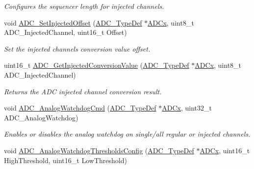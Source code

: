 \begin{DoxyCompactItemize}
\begin{DoxyCompactList}\small\item\em Configures the sequencer length for injected channels. \end{DoxyCompactList}\item 
void \mbox{\hyperlink{group___a_d_c___exported___functions_ga07a942613088ab3ecfc3d97a20475920}{A\+D\+C\+\_\+\+Set\+Injected\+Offset}} (\mbox{\hyperlink{struct_a_d_c___type_def}{A\+D\+C\+\_\+\+Type\+Def}} $\ast$\mbox{\hyperlink{group___s_t_m32_f1_x_x___n_u_c_l_e_o___l_o_w___l_e_v_e_l___exported___constants_gab44c1065d38c298955fc028346984340}{A\+D\+Cx}}, uint8\+\_\+t A\+D\+C\+\_\+\+Injected\+Channel, uint16\+\_\+t Offset)
\begin{DoxyCompactList}\small\item\em Set the injected channels conversion value offset. \end{DoxyCompactList}\item 
uint16\+\_\+t \mbox{\hyperlink{group___a_d_c___exported___functions_ga1dea5ed24571a2e0ce4cbd41c9c1ec46}{A\+D\+C\+\_\+\+Get\+Injected\+Conversion\+Value}} (\mbox{\hyperlink{struct_a_d_c___type_def}{A\+D\+C\+\_\+\+Type\+Def}} $\ast$\mbox{\hyperlink{group___s_t_m32_f1_x_x___n_u_c_l_e_o___l_o_w___l_e_v_e_l___exported___constants_gab44c1065d38c298955fc028346984340}{A\+D\+Cx}}, uint8\+\_\+t A\+D\+C\+\_\+\+Injected\+Channel)
\begin{DoxyCompactList}\small\item\em Returns the A\+DC injected channel conversion result. \end{DoxyCompactList}\item 
void \mbox{\hyperlink{group___a_d_c___exported___functions_gad017d69bec6e497afd35ba25ea22d86e}{A\+D\+C\+\_\+\+Analog\+Watchdog\+Cmd}} (\mbox{\hyperlink{struct_a_d_c___type_def}{A\+D\+C\+\_\+\+Type\+Def}} $\ast$\mbox{\hyperlink{group___s_t_m32_f1_x_x___n_u_c_l_e_o___l_o_w___l_e_v_e_l___exported___constants_gab44c1065d38c298955fc028346984340}{A\+D\+Cx}}, uint32\+\_\+t A\+D\+C\+\_\+\+Analog\+Watchdog)
\begin{DoxyCompactList}\small\item\em Enables or disables the analog watchdog on single/all regular or injected channels. \end{DoxyCompactList}\item 
void \mbox{\hyperlink{group___a_d_c___exported___functions_ga79588d02aa8e4147f21cb90a4708366d}{A\+D\+C\+\_\+\+Analog\+Watchdog\+Thresholds\+Config}} (\mbox{\hyperlink{struct_a_d_c___type_def}{A\+D\+C\+\_\+\+Type\+Def}} $\ast$\mbox{\hyperlink{group___s_t_m32_f1_x_x___n_u_c_l_e_o___l_o_w___l_e_v_e_l___exported___constants_gab44c1065d38c298955fc028346984340}{A\+D\+Cx}}, uint16\+\_\+t High\+Threshold, uint16\+\_\+t Low\+Threshold)

\end{DoxyCompactItemize}
